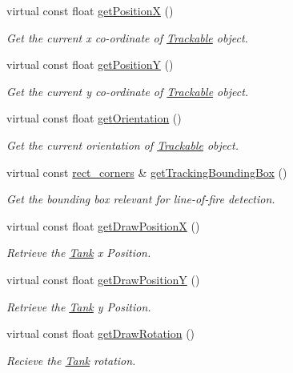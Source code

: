 \begin{DoxyCompactItemize}
virtual const float \hyperlink{classTank_ab1e8f987cf6702d0a5f902fcdce2dc38}{get\-Position\-X} ()
\begin{DoxyCompactList}\small\item\em Get the current x co-\/ordinate of \hyperlink{classTrackable}{Trackable} object. \end{DoxyCompactList}\item 
virtual const float \hyperlink{classTank_ac78e2f8ecc69da315f68f4244f452bde}{get\-Position\-Y} ()
\begin{DoxyCompactList}\small\item\em Get the current y co-\/ordinate of \hyperlink{classTrackable}{Trackable} object. \end{DoxyCompactList}\item 
virtual const float \hyperlink{classTank_a893bb5e1f3ac38bd2960d1f629505ea0}{get\-Orientation} ()
\begin{DoxyCompactList}\small\item\em Get the current orientation of \hyperlink{classTrackable}{Trackable} object. \end{DoxyCompactList}\item 
virtual const \hyperlink{structrect__corners}{rect\-\_\-corners} \& \hyperlink{classTank_ac3bc1fb6dc7e36c781b6cf8a29ae87eb}{get\-Tracking\-Bounding\-Box} ()
\begin{DoxyCompactList}\small\item\em Get the bounding box relevant for line-\/of-\/fire detection. \end{DoxyCompactList}\item 
virtual const float \hyperlink{classTank_a679ab65e5d46ee6e7fa5fe517101131f}{get\-Draw\-Position\-X} ()
\begin{DoxyCompactList}\small\item\em Retrieve the \hyperlink{classTank}{Tank} x Position. \end{DoxyCompactList}\item 
virtual const float \hyperlink{classTank_a5778b15fc49b6cd1086f3a80383b2a37}{get\-Draw\-Position\-Y} ()
\begin{DoxyCompactList}\small\item\em Retrieve the \hyperlink{classTank}{Tank} y Position. \end{DoxyCompactList}\item 
virtual const float \hyperlink{classTank_aa117515fda912f25f9f7d5a8ce4055d7}{get\-Draw\-Rotation} ()
\begin{DoxyCompactList}\small\item\em Recieve the \hyperlink{classTank}{Tank} rotation. \end{DoxyCompactList}\item 

\end{DoxyCompactItemize}
